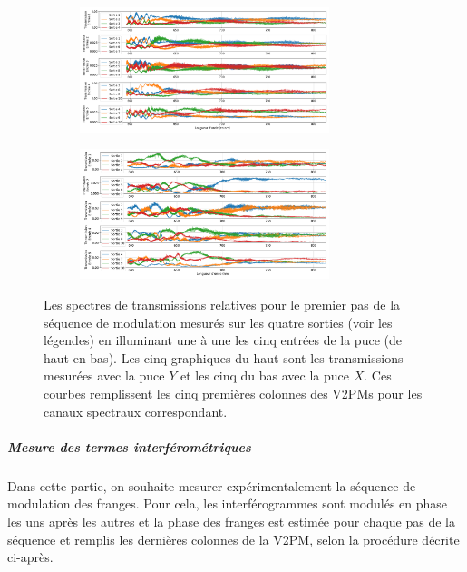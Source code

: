 \begin{figure}[ht!]
    \begin{subfigure}{\textwidth}
        \centering
        \includegraphics[width=0.8\textwidth]{Figure_Chap3/20221010_P2VM_01_SpectralThroughput.png}
    \end{subfigure}
    \begin{subfigure}{\textwidth}
        \centering
        \includegraphics[width=0.8\textwidth]{Figure_Chap3/20220811_P2VM_01_SpectralThroughput.png}
    \end{subfigure}
    \caption[Transmissions relatives mesurées sur chaque entrée des puces $Y$ et $X$, constituant les 5 premières colonnes de la V2PM.]{Les spectres de transmissions relatives pour le premier pas de la séquence de modulation mesurés sur les quatre sorties (voir les légendes) en illuminant une à une les cinq entrées de la puce (de haut en bas). Les cinq graphiques du haut sont les transmissions mesurées avec la puce $Y$ et les cinq du bas avec la puce $X$. Ces courbes remplissent les cinq premières colonnes des V2PMs pour les canaux spectraux correspondant.}
    \label{fig:V2PMtransmission}
\end{figure}


\subparagraph{Mesure des termes interférométriques \\}

Dans cette partie, on souhaite mesurer expérimentalement la séquence de modulation des franges. Pour cela, les interférogrammes sont modulés en phase les uns après les autres et la phase des franges est estimée pour chaque pas de la séquence et remplis les dernières colonnes de la \ac{V2PM}, selon la procédure décrite ci-après.

